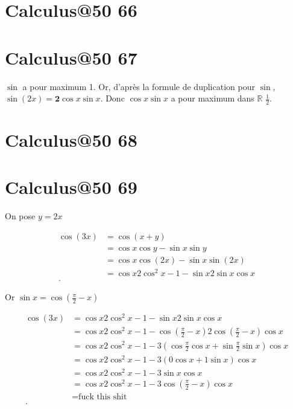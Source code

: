 \documentclass{article}
\newcommand{\R}{\mathbb{R}}
\begin{document}
\section{Calculus@50 66} %

\section{Calculus@50 67} %

$ \sin$ a pour maximum 1. Or, d'après la formule de duplication pour $ \sin$, $ \sin(2x)=\mathbf{2}\cos x\sin x$. Donc $\cos x \sin x$ a pour maximum dans $\R$ $\frac{1}{2}$.

\section{Calculus@50 68} %

\section{Calculus@50 69} %

On pose $y = 2x$

\begin{align*}
	\cos(3x) &= \cos(x+y) \\
	  	&= \cos x \cos y - \sin x \sin y \\
		  &= \cos x \cos(2x) - \sin x \sin(2x) \\
		  &= \cos x 2\cos^2x-1 - \sin x 2\sin x \cos x\\
.\end{align*}

Or $ \sin x = \cos\left( \frac{\pi}{2}-x \right) $

\begin{align*}
	\cos (3x)   &= \cos x 2\cos^2x-1 - \sin x 2\sin x \cos x\\
		    &= \cos x 2 \cos^2x - 1 - \cos(\frac{\pi}{2}-x) 2 \cos(\frac{\pi}{2}-x) \cos x \\
		    &= \cos x 2 \cos ^2x-1 - 3\left( \cos \frac{\pi}{2} \cos x + \sin \frac{\pi}{2} \sin x \right) \cos x   \\
		    &= \cos x 2 \cos^2x-1 - 3\left( 0  \cos x + 1 \sin x \right) \cos x \\
		    &= \cos x 2 \cos^2x-1-3\sin x \cos x  \\
		    &= \cos x 2 \cos^2x-1-3\cos\left( \frac{\pi}{2}-x \right) \cos x \\
		    &=  \text{fuck this shit} \\
.\end{align*}
\end{document}
